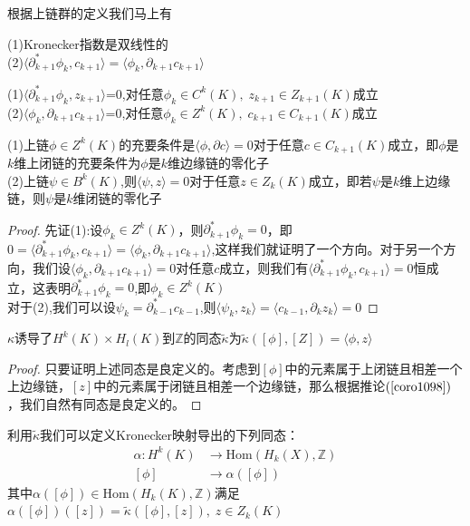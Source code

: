 根据上链群的定义我们马上有
\begin{proposition}
(1)Kronecker指数是双线性的\\
(2)$\langle\partial^{*}_{k+1}\phi_{k},c_{k+1}\rangle=\langle\phi_{k},\partial_{k+1}c_{k+1}\rangle$
\end{proposition}
\begin{corollary}
(1)$\langle\partial_{k+1}^{*}\phi_{k},z_{k+1}\rangle$=0,对任意$\phi_{k}\in C^{k}(K),\;z_{k+1}\in Z_{k+1}(K)$成立\\
(2)$\langle\phi_{k},\partial_{k+1}c_{k+1}\rangle$=0,对任意$\phi_{k}\in Z^{k}(K),\;c_{k+1}\in C_{k+1}(K)$成立
\end{corollary}
\begin{corollary}\label{coro1098}
(1)上链$\phi\in Z^{k}(K)$的充要条件是$\langle\phi,\partial c \rangle=0$对于任意$c\in C_{k+1}(K)$成立，即$\phi$是$k$维上闭链的充要条件为$\phi$是$k$维边缘链的零化子\\
(2)上链$\psi\in B^{k}(K)$,则$\langle\psi,z\rangle=0$对于任意$z\in Z_{k}(K)$成立，即若$\psi$是$k$维上边缘链，则$\psi$是$k$维闭链的零化子
\end{corollary}
\begin{proof}
先证(1):设$\phi_{k}\in Z^{k}(K)$，则$\partial_{k+1}^{*}\phi_{k}=0$，即$0=\langle \partial_{k+1}^{*}\phi_{k},c_{k+1}\rangle=\langle \phi_{k},\partial_{k+1}c_{k+1}\rangle$,这样我们就证明了一个方向。对于另一个方向，我们设$\langle \phi_{k},\partial_{k+1}c_{k+1}\rangle=0$对任意$c$成立，则我们有$\langle \partial_{k+1}^{*}\phi_{k},c_{k+1}\rangle=0$恒成立，这表明$\partial_{k+1}^{*}\phi_{k}=0$,即$\phi_{k}\in Z^{k}(K)$\\
对于(2),我们可以设$\psi_{k}=\partial^{*}_{k-1}c_{k-1}$,则$\langle\psi_{k},z_{k}\rangle=\langle c_{k-1},\partial_{k}z_{k}\rangle=0$
\end{proof}
\begin{corollary}
$\kappa$诱导了$H^{k}(K)\times H_{l}(K)$到$\mathbb{Z}$的同态$\tilde{\kappa}$为$\tilde{\kappa}([\phi],[{Z}])=\langle\phi,z\rangle$
\end{corollary}
\begin{proof}
只要证明上述同态是良定义的。考虑到$[\phi]$中的元素属于上闭链且相差一个上边缘链，$[z]$中的元素属于闭链且相差一个边缘链，那么根据推论$(\ref{coro1098})$，我们自然有同态是良定义的。
\end{proof}
利用$\tilde{\kappa}$我们可以定义Kronecker映射导出的下列同态：
\begin{equation*}
    \begin{aligned}
    \alpha:H^{k}(K)&\rightarrow \text{Hom}(H_{k}(X),\mathbb{Z})\\
    [\phi]&\rightarrow\alpha([\phi])
    \end{aligned}
\end{equation*}
其中$\alpha([\phi])\in \text{Hom}(H_{k}(K),\mathbb{Z})$满足$\alpha([\phi])([z])=\tilde{\kappa}([\phi],[z]),\;z\in Z_{k}(K)$


